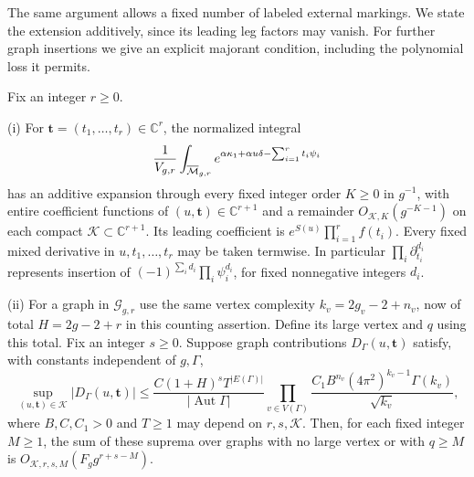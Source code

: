 The same argument allows a fixed number of labeled external
markings. We state the extension additively, since its leading leg
factors may vanish. For further graph insertions we give an explicit
majorant condition, including the polynomial loss it permits.

\begin{crl}
\label{crl:s03:marked-extension}
Fix an integer $r\geq0$.

\textup{(i)} For $\mathbf t=(t_1,\ldots,t_r)\in\mathbb C^r$,
the normalized integral
\begin{equation}
\label{eq:s03:marked-deformation}
\frac1{V_{g,r}}\int_{\overline{\mathcal{M}}_{g,r}}
 e^{\alpha\kappa_1+\alpha u\delta-\sum_{i=1}^rt_i\psi_i}
\end{equation}
has an additive expansion through every fixed integer order $K\geq0$
in $g^{-1}$, with
entire coefficient functions of $(u,\mathbf t)\in\mathbb C^{r+1}$
and a remainder $O_{\mathcal K,K}(g^{-K-1})$ on each compact
$\mathcal K\subset\mathbb C^{r+1}$. Its leading coefficient is
$e^{S(u)}\prod_{i=1}^rf(t_i)$.
Every fixed mixed derivative in $u,t_1,\ldots,t_r$ may be taken
termwise. In particular $\prod_i\partial_{t_i}^{d_i}$ represents
insertion of $(-1)^{\sum_i d_i}\prod_i\psi_i^{d_i}$, for fixed
nonnegative integers $d_i$.

\textup{(ii)} For a graph in $\mathcal G_{g,r}$ use the same
vertex complexity $k_v=2g_v-2+n_v$, now of total $H=2g-2+r$ in
this counting assertion. Define its large vertex and $q$ using this
total. Fix an integer $s\geq0$. Suppose graph contributions
$D_\Gamma(u,\mathbf t)$ satisfy, with constants independent of
$g,\Gamma$,
\begin{equation}
\label{eq:s03:decoration-condition}
\sup_{(u,\mathbf t)\in\mathcal K}|D_\Gamma(u,\mathbf t)|
\leq
\frac{C(1+H)^sT^{|E(\Gamma)|}}{|\operatorname{Aut}\Gamma|}
\prod_{v\in V(\Gamma)}
 \frac{C_1B^{n_v}(4\pi^2)^{k_v-1}\Gamma(k_v)}{\sqrt{k_v}},
\end{equation}
where $B,C,C_1>0$ and $T\geq1$ may depend on $r,s,\mathcal K$.
Then, for each fixed integer $M\geq1$, the sum of these suprema
over graphs with no large vertex or with $q\geq M$ is
$O_{\mathcal K,r,s,M}(F_g g^{r+s-M})$.
\end{crl}
